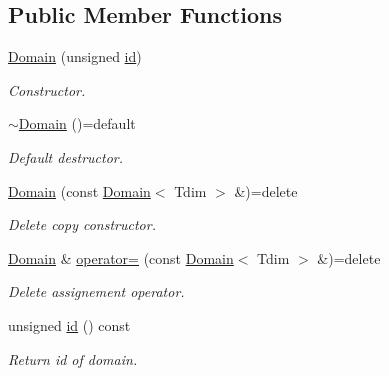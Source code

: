 \subsection*{Public Member Functions}
\begin{DoxyCompactItemize}
\item 
\hyperlink{classmfm_1_1_domain_a84ffcd3a69703e5b6432a95dfcebbbd8}{Domain} (unsigned \hyperlink{classmfm_1_1_domain_a39557a2418dd51a972a2c09ed266ea15}{id})
\begin{DoxyCompactList}\small\item\em Constructor. \end{DoxyCompactList}\item 
\mbox{\label{classmfm_1_1_domain_a9c4cc16b90112f5d7baca60e11487b90}} 
\hyperlink{classmfm_1_1_domain_a9c4cc16b90112f5d7baca60e11487b90}{$\sim$\+Domain} ()=default
\begin{DoxyCompactList}\small\item\em Default destructor. \end{DoxyCompactList}\item 
\mbox{\label{classmfm_1_1_domain_a84438b3ce4b84cfe67b9f5a0690dac90}} 
\hyperlink{classmfm_1_1_domain_a84438b3ce4b84cfe67b9f5a0690dac90}{Domain} (const \hyperlink{classmfm_1_1_domain}{Domain}$<$ Tdim $>$ \&)=delete
\begin{DoxyCompactList}\small\item\em Delete copy constructor. \end{DoxyCompactList}\item 
\mbox{\label{classmfm_1_1_domain_ac62e769317bb03385c6d4404f08173fc}} 
\hyperlink{classmfm_1_1_domain}{Domain} \& \hyperlink{classmfm_1_1_domain_ac62e769317bb03385c6d4404f08173fc}{operator=} (const \hyperlink{classmfm_1_1_domain}{Domain}$<$ Tdim $>$ \&)=delete
\begin{DoxyCompactList}\small\item\em Delete assignement operator. \end{DoxyCompactList}\item 
\mbox{\label{classmfm_1_1_domain_a39557a2418dd51a972a2c09ed266ea15}} 
unsigned \hyperlink{classmfm_1_1_domain_a39557a2418dd51a972a2c09ed266ea15}{id} () const
\begin{DoxyCompactList}\small\item\em Return id of domain. \end{DoxyCompactList}\item 

\end{DoxyCompactItemize}

